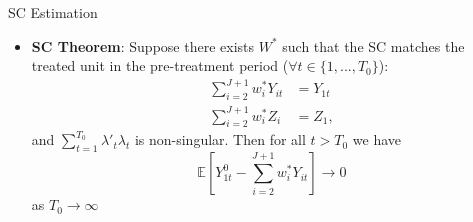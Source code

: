 \documentclass[dvipsnames,hyperref={pdfpagelabels=false}]{beamer}
\begin{document}
\begin{frame}{SC Estimation}
\begin{itemize}
\item \textbf{SC Theorem}: Suppose there exists $W^*$ such that the SC matches the treated unit in the pre-treatment period ($\forall t\in\{1,...,T_0\}$): 
\begin{align*}
\sum^{J+1}_{i=2}w^*_{i}Y_{it}&=Y_{1t} \\
\sum^{J+1}_{i=2}w^*_{i}Z_i&=Z_1,
\end{align*}
and $\sum^{T_0}_{t=1}\lambda'_t\lambda_t$ is non-singular. Then for all $t>T_0$ we have
\begin{equation*}
\mathbb{E}\left[Y^0_{1t}-\sum^{J+1}_{i=2}w^*_{i}Y_{it}\right]\rightarrow 0
\end{equation*}
as $T_0\rightarrow\infty$ 

\end{itemize}
\end{frame}
\end{document}
